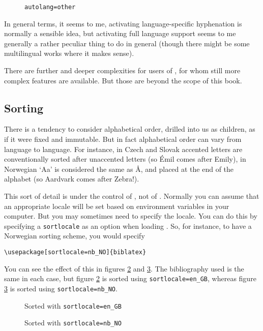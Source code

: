 \begin{figure}
\caption{\texttt{autolang=other}\label{proust2}}
\end{figure}

In general terms, it seems to me, activating language-specific
hyphenation is normally a sensible idea, but activating full language
support seems to me generally a rather peculiar thing to do in general
(though there might be some multilingual works where it makes sense).

There are further and deeper complexities for users of
, for whom still more complex features are
available. But those are beyond the scope of this book.

\subsection{Sorting}

There is a tendency to consider alphabetical order, drilled into us as
children, as if it were fixed and immutable. But in fact alphabetical
order can vary from language to language. For instance, in Czech and
Slovak accented letters are conventionally sorted after unaccented
letters (so \'{E}mil comes after Emily), in Norwegian `Aa' is
considered the same as \r{A}, and placed at the end of the alphabet
(so Aardvark comes after Zebra!).

This sort of detail is under the control of , not of
\biblatex. Normally you can assume that an appropriate locale will be
set based on environment variables in your computer. But you may
sometimes need to specify the locale. You can do this by specifying a
\texttt{sortlocale} as an option when loading \biblatex. So, for
instance, to have a Norwegian sorting scheme, you would specify
\begin{verbatim}
\usepackage[sortlocale=nb_NO]{biblatex}
\end{verbatim}

You can see the effect of this in figures \ref{zebra:en} and
\ref{zebra:no}. The bibliography used is the same in each case, but
figure \ref{zebra:en} is sorted using \texttt{sortlocale=en\_GB},
whereas figure \ref{zebra:no} is sorted using
\texttt{sortlocale=nb\_NO}.

\begin{figure}
\caption{Sorted with \texttt{sortlocale=en\_GB}\label{zebra:en}}
\end{figure}

\begin{figure}
\caption{Sorted with \texttt{sortlocale=nb\_NO}\label{zebra:no}}
\end{figure}

